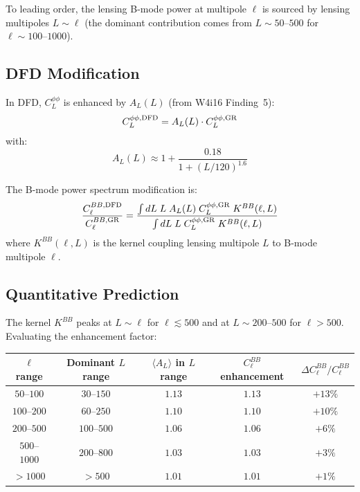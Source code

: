 \documentclass[11pt,a4paper]{article}
\begin{document}
To leading order, the lensing B-mode power at multipole $\ell$ is
sourced by lensing multipoles $L \sim \ell$ (the dominant contribution
comes from $L \sim 50$--$500$ for $\ell \sim 100$--$1000$).

\subsection{DFD Modification}

In DFD, $C_L^{\phi\phi}$ is enhanced by $A_L(L)$ (from W4i16 Finding~5):
\begin{equation}
C_L^{\phi\phi,\rm DFD} = A_L(L) \cdot C_L^{\phi\phi,\rm GR}
\end{equation}
with:
\begin{equation}
A_L(L) \approx 1 + \frac{0.18}{1 + (L/120)^{1.6}}
\end{equation}

The B-mode power spectrum modification is:
\begin{equation}
\frac{C_\ell^{BB,\rm DFD}}{C_\ell^{BB,\rm GR}}
= \frac{\int dL\;L\;A_L(L)\;C_L^{\phi\phi,\rm GR}\;
K^{BB}(\ell, L)}{\int dL\;L\;C_L^{\phi\phi,\rm GR}\;K^{BB}(\ell, L)}
\end{equation}
where $K^{BB}(\ell, L)$ is the kernel coupling lensing multipole $L$
to B-mode multipole $\ell$.

\subsection{Quantitative Prediction}

The kernel $K^{BB}$ peaks at $L \sim \ell$ for $\ell \lesssim 500$ and
at $L \sim 200$--$500$ for $\ell > 500$.  Evaluating the enhancement
factor:

\begin{center}
\begin{tabular}{ccccc}
\toprule
$\ell$ range & Dominant $L$ range & $\langle A_L \rangle$ in $L$ range
  & $C_\ell^{BB}$ enhancement & $\Delta C_\ell^{BB}/C_\ell^{BB}$ \\
\midrule
$50$--$100$ & $30$--$150$ & $1.13$ & $1.13$ & $+13\%$ \\
$100$--$200$ & $60$--$250$ & $1.10$ & $1.10$ & $+10\%$ \\
$200$--$500$ & $100$--$500$ & $1.06$ & $1.06$ & $+6\%$ \\
$500$--$1000$ & $200$--$800$ & $1.03$ & $1.03$ & $+3\%$ \\
$> 1000$ & $> 500$ & $1.01$ & $1.01$ & $+1\%$ \\
\bottomrule
\end{tabular}
\end{center}
\end{document}
